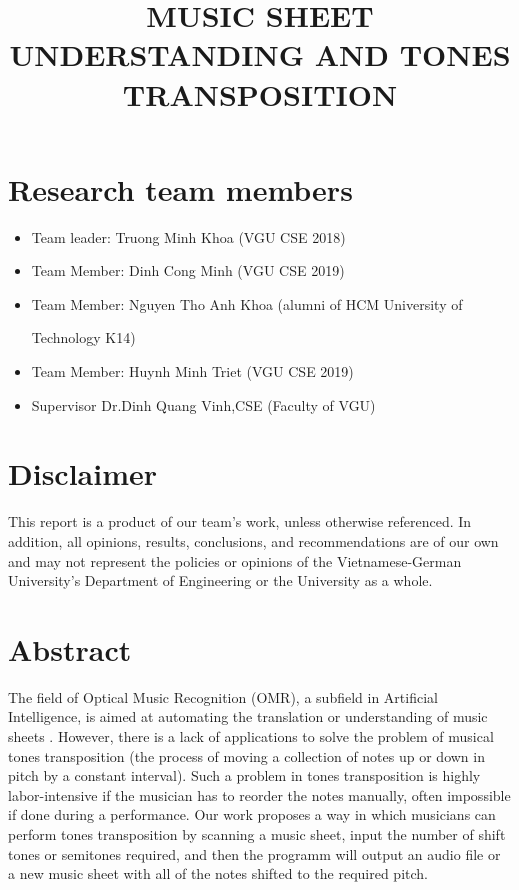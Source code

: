 \documentclass[a4paper,12pt]{report}
\title{ MUSIC SHEET UNDERSTANDING AND TONES TRANSPOSITION}
\author{}
\begin{document}
\afterpage{\null\newpage}

\maketitle

\tableofcontents

\clearpage

\section{Research team members}
\begin{itemize}
	\item Team leader:      \hfill Truong Minh Khoa  (VGU CSE 2018)
	\item Team Member: 		\hfill Dinh Cong Minh (VGU CSE 2019)
	\item Team Member:	    \hfill Nguyen Tho Anh Khoa (alumni of HCM University of 

                            \hfill Technology K14)
	\item Team Member:	    \hfill Huynh Minh Triet (VGU CSE 2019)
    \item Supervisor        \hfill Dr.Dinh Quang Vinh,CSE (Faculty of VGU) 
\end{itemize}


\section{Disclaimer} 
This report is a product of our team's work, unless otherwise referenced. In
addition, all opinions, results, conclusions, and recommendations are of our own
and may not represent the policies or opinions of the Vietnamese-German
University's Department of Engineering or the University as a whole. 

\clearpage

\section{Abstract} 

The field of Optical Music Recognition (OMR), a subfield in Artificial
Intelligence, is aimed at automating the translation or understanding of music
sheets \cite{Calvo-Zaragoza}.  However, there is a lack of applications to solve
the problem of musical tones transposition (the process of moving a collection
of notes up or down in pitch by a constant interval).  Such a problem in tones
transposition is highly labor-intensive if the musician has to reorder the notes
manually, often impossible if done during a performance. Our work proposes a way
in which musicians can perform tones transposition by scanning a music sheet,
input the number of shift tones or semitones required, and then the programm
will output an audio file or a new music sheet with all of the notes shifted to
the required pitch. 
\end{document}
